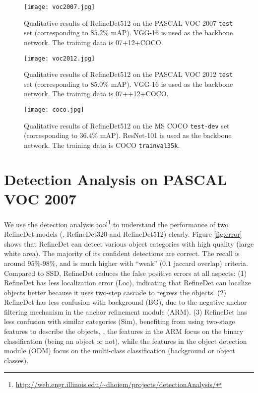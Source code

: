 \documentclass[10pt,twocolumn,letterpaper]{article}
\begin{document}
\begin{figure*}
\centering
\texttt{[image: voc2007.jpg]}
\caption{Qualitative results of RefineDet512 on the PASCAL VOC 2007 {\tt test} set (corresponding to $85.2\%$ mAP). VGG-16 is used as the backbone network. The training data is 07+12+COCO.}
\label{fig:pascal-voc-2007}
\end{figure*}

\begin{figure*}
\centering
\texttt{[image: voc2012.jpg]}
\caption{Qualitative results of RefineDet512 on the PASCAL VOC 2012 {\tt test} set (corresponding to $85.0\%$ mAP). VGG-16 is used as the backbone network. The training data is 07++12+COCO.}
\label{fig:pascal-voc-2012}
\end{figure*}

\begin{figure*}
\centering
\texttt{[image: coco.jpg]}
\caption{Qualitative results of RefineDet512 on the MS COCO {\tt test-dev} set (corresponding to $36.4\%$ mAP). ResNet-101 is used as the backbone network. The training data is COCO {\tt trainval35k}.}
\label{fig:coco}
\end{figure*}

\section{Detection Analysis on PASCAL VOC 2007}
We use the detection analysis tool\footnote{\url{http://web.engr.illinois.edu/~dhoiem/projects/detectionAnalysis/}} to understand the performance of two RefineDet models (\ie, RefineDet320 and RefineDet512) clearly. Figure \ref{fig:error} shows that RefineDet can detect various object categories with high quality (large white area). The majority of its confident detections are correct. The recall is around $95\%$-$98\%$, and is much higher with ``weak'' ($0.1$ jaccard overlap) criteria. Compared to SSD, RefineDet reduces the false positive errors at all aspects: (1) RefineDet has less localization error (Loc), indicating that RefineDet can localize objects better because it uses two-step cascade to regress the objects. (2) RefineDet has less confusion with background (BG), due to the negative anchor filtering mechanism in the anchor refinement module (ARM). (3) RefineDet has less confusion with similar categories (Sim), benefiting from using two-stage features to describe the objects, \ie, the features in the ARM focus on the binary classification (being an object or not), while the features in the object detection module (ODM) focus on the multi-class classification (background or object classes).
\end{document}
